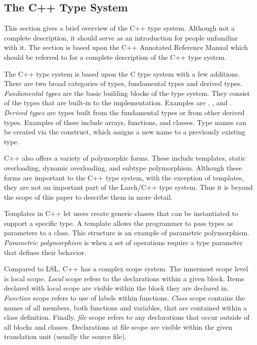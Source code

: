 \subsection{The C++ Type System}
\label{cppts}
This section gives a brief overview of the C++ type
system. Although not a complete description, it should serve as an
introduction for people unfamiliar with it. The section is based upon the C++
Annotated Reference Manual \cite{Ellis-Stroustrup90} which should be
referred to for a complete description of the C++ type system.

The C++ type system is based upon the C type system with a few
additions. There are two broad categories of types, fundamental
types and derived types. \emph{Fundamental types} are the basic
building blocks of the type system. They consist of the types that are
built-in to the implementation. Examples are ,
, and . \emph{Derived types} are types
built from the fundamental types or from other derived types. Examples of
these include arrays, functions, and classes. Type names can be
created via the  construct, which assigns a new name to
a previously existing type. 

C++ also offers a variety of polymorphic forms. These include
templates, static overloading, dynamic overloading, and subtype
polymorphism. Although these forms are important to the C++ type
system, with the exception of templates, they are not an important
part of the Larch/C++ type system. Thus it is beyond the scope of this
paper to describe them in more detail.

Templates in C++ let users create generic classes that can be
instantiated to support a specific type. A template allows the
programmer to pass types as parameters to a class. This structure is
an example of parametric polymorphism. \emph{Parametric polymorphism}
is when a set of operations require a type parameter that defines
their behavior.

Compared to LSL, C++ has a complex scope system. The innermost scope
level is local scope. \emph{Local} scope refers to the declarations
within a given block. Items declared with local scope are visible
within the block they are declared in. \emph{Function} scope refers to use of labels within
functions. \emph{Class} scope contains the names of all members, both
functions and variables, that are contained within a class
definition. Finally, \emph{file} scope refers to any declarations that
occur outside of all blocks and classes. Declarations at file scope
are visible within the given translation unit (usually the source
file).

